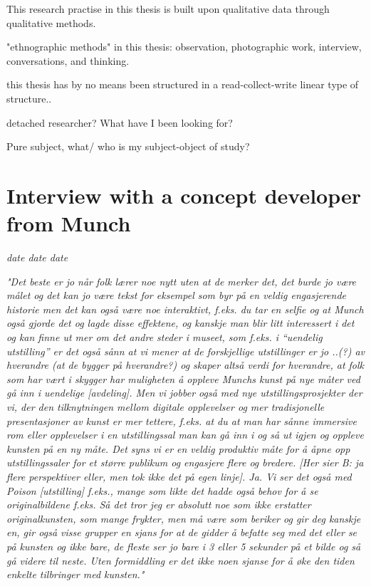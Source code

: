 This research practise in this thesis is built upon qualitative data through qualitative methods. 

"ethnographic methods" in this thesis: observation, photographic work, interview, conversations, and thinking. 

this thesis has by no means been structured in a read-collect-write linear type of structure.. 

detached researcher? 
What have I been looking for?

Pure subject, what/ who is my subject-object of study?

\section{Interview with a concept developer from Munch}
\par
\emph{date date date}
\par


\emph{"Det beste er jo når folk lærer noe nytt uten at de merker det, det burde jo være målet og det kan jo være tekst for eksempel som byr på en veldig engasjerende historie men det kan også være noe interaktivt, f.eks. du tar en selfie og at Munch også gjorde det og lagde disse effektene, og kanskje man blir litt interessert i det og kan finne ut mer om det andre steder i museet, som f.eks. i “uendelig utstilling” er det også sånn at vi mener at de forskjellige utstillinger er jo ..(?) av hverandre (at de bygger på hverandre?) og skaper altså verdi for hverandre, at folk som har vært i skygger har muligheten å oppleve Munchs kunst på nye måter ved gå inn i uendelige [avdeling]. Men vi jobber også med nye utstillingsprosjekter der vi, der den tilknytningen mellom digitale opplevelser og mer tradisjonelle presentasjoner av kunst er mer tettere, f.eks. at du at man har sånne immersive rom eller opplevelser i en utstillingssal man kan gå inn i og så ut igjen og oppleve kunsten på en ny måte. Det syns vi er en veldig produktiv måte for å åpne opp utstillingssaler for et større publikum og engasjere flere og bredere. [Her sier B: ja flere perspektiver eller, men tok ikke det på egen linje]. Ja. Vi ser det også med Poison [utstilling] f.eks., mange som likte det hadde også behov for å se originalbildene f.eks. Så det tror jeg er absolutt noe som ikke erstatter originalkunsten, som mange frykter, men må være som beriker og gir deg kanskje en, gir også visse grupper en sjans for at de gidder å befatte seg med det eller se på kunsten og ikke bare, de fleste ser jo bare i 3 eller 5 sekunder på et bilde og så gå videre til neste. Uten formiddling er det ikke noen sjanse for å øke den tiden enkelte tilbringer med kunsten."}



